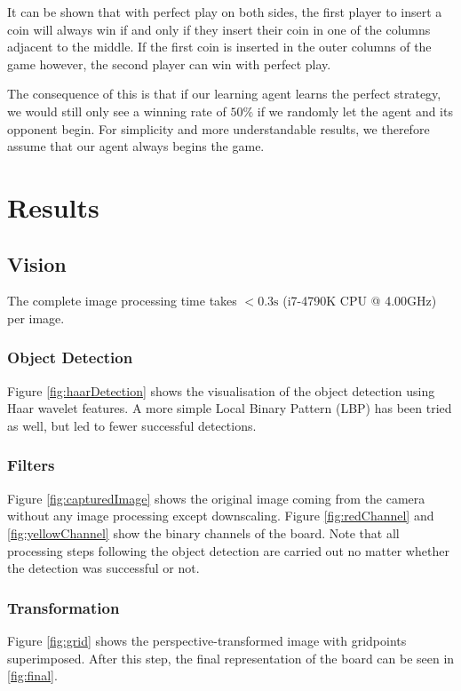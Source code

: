 \documentclass[10pt,twocolumn,letterpaper]{article}
\begin{document}
It can be shown that with perfect play on both sides, the first player to insert a coin will always win if and only if they insert their coin in one of the columns adjacent to the middle.
If the first coin is inserted in the outer columns of the game however, the second player can win with perfect play.

The consequence of this is that if our learning agent learns the perfect strategy, we would still only see a winning rate of $50\%$ if we randomly
let the agent and its opponent begin.
For simplicity and more understandable results, we therefore assume that our agent always begins the game.

\section{Results}

\subsection{Vision}
The complete image processing time takes $< 0.3\mathrm{s}$ (i7-4790K CPU @ 4.00GHz) per image.

\subsubsection{Object Detection}
Figure \ref{fig:haarDetection} shows the visualisation of the object detection using Haar wavelet features.
A more simple Local Binary Pattern (LBP) has been tried as well, but led to fewer successful detections.

\subsubsection{Filters}
Figure \ref{fig:capturedImage} shows the original image coming from the camera without any image processing except downscaling.
Figure \ref{fig:redChannel} and \ref{fig:yellowChannel} show the binary channels of the board.
Note that all processing steps following the object detection are carried out no matter whether the detection was successful or not.
\subsubsection{Transformation}
Figure \ref{fig:grid} shows the perspective-transformed image with gridpoints superimposed.
After this step, the final representation of the board can be seen in \ref{fig:final}.
\end{document}
